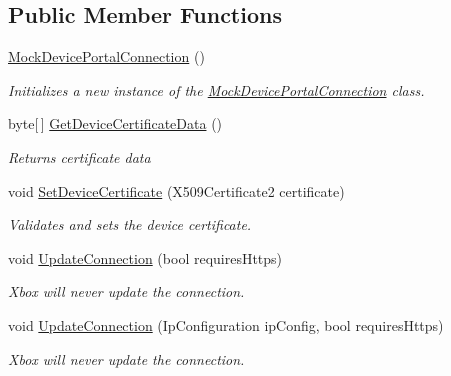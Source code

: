 \subsection*{Public Member Functions}
\begin{DoxyCompactItemize}
\item 
\hyperlink{class_microsoft_1_1_tools_1_1_windows_device_portal_1_1_tests_1_1_mock_device_portal_connection_ae213a0e4a9b39c70c3d07f59a0aa7f8d}{Mock\+Device\+Portal\+Connection} ()
\begin{DoxyCompactList}\small\item\em Initializes a new instance of the \hyperlink{class_microsoft_1_1_tools_1_1_windows_device_portal_1_1_tests_1_1_mock_device_portal_connection}{Mock\+Device\+Portal\+Connection} class. \end{DoxyCompactList}\item 
byte\mbox{[}$\,$\mbox{]} \hyperlink{class_microsoft_1_1_tools_1_1_windows_device_portal_1_1_tests_1_1_mock_device_portal_connection_a95c810720923005d81d165c646c64dc2}{Get\+Device\+Certificate\+Data} ()
\begin{DoxyCompactList}\small\item\em Returns certificate data \end{DoxyCompactList}\item 
void \hyperlink{class_microsoft_1_1_tools_1_1_windows_device_portal_1_1_tests_1_1_mock_device_portal_connection_aaac1677ff2b9f737a965d4e47b09527c}{Set\+Device\+Certificate} (X509\+Certificate2 certificate)
\begin{DoxyCompactList}\small\item\em Validates and sets the device certificate. \end{DoxyCompactList}\item 
void \hyperlink{class_microsoft_1_1_tools_1_1_windows_device_portal_1_1_tests_1_1_mock_device_portal_connection_abc6b01b5b444a1496e334004c9a342f0}{Update\+Connection} (bool requires\+Https)
\begin{DoxyCompactList}\small\item\em Xbox will never update the connection. \end{DoxyCompactList}\item 
void \hyperlink{class_microsoft_1_1_tools_1_1_windows_device_portal_1_1_tests_1_1_mock_device_portal_connection_a5fdffbca0acde9a3bb387688f80f0d64}{Update\+Connection} (Ip\+Configuration ip\+Config, bool requires\+Https)
\begin{DoxyCompactList}\small\item\em Xbox will never update the connection. \end{DoxyCompactList}\end{DoxyCompactItemize}
